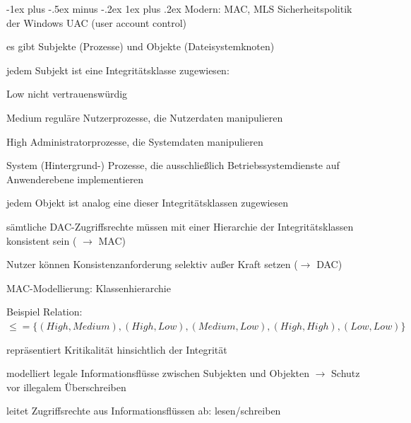 \documentclass[a4paper]{article}
\makeatletter
\renewcommand{\subsubsection}{\@startsection{subsubsection}{3}{0mm}%
 {-1ex plus -.5ex minus -.2ex}%
 {1ex plus .2ex}%
 {\normalfont\small\bfseries}}
\makeatother
\begin{document}
\begin{multicols}{3}
    \subsubsection{Modern: MAC, MLS}
    Sicherheitspolitik der Windows UAC (user account control)
    \begin{itemize*}
        \item es gibt Subjekte (Prozesse) und Objekte (Dateisystemknoten)
        \item jedem Subjekt ist eine Integritätsklasse zugewiesen:
        \begin{description*}
            \item[Low] nicht vertrauenswürdig
            \item[Medium] reguläre Nutzerprozesse, die Nutzerdaten manipulieren
            \item[High] Administratorprozesse, die Systemdaten manipulieren
            \item[System] (Hintergrund-) Prozesse, die ausschließlich Betriebssystemdienste auf Anwenderebene implementieren
        \end{description*}
        \item jedem Objekt ist analog eine dieser Integritätsklassen zugewiesen
        \item sämtliche DAC-Zugriffsrechte müssen mit einer Hierarchie der Integritätsklassen konsistent sein ( $\rightarrow$ MAC)
        \item Nutzer können Konsistenzanforderung selektiv außer Kraft setzen ($\rightarrow$ DAC)
    \end{itemize*}

    MAC-Modellierung: Klassenhierarchie

    Beispiel Relation: $\leq=\{(High,Medium), (High,Low), (Medium,Low), (High,High), (Low,Low)\}$
    \begin{itemize*}
        \item repräsentiert Kritikalität hinsichtlich der Integrität
        \item modelliert legale Informationsflüsse zwischen Subjekten und Objekten $\rightarrow$ Schutz vor illegalem Überschreiben
        \item leitet Zugriffsrechte aus Informationsflüssen ab: lesen/schreiben
    \end{itemize*}



\end{multicols}
\end{document}
